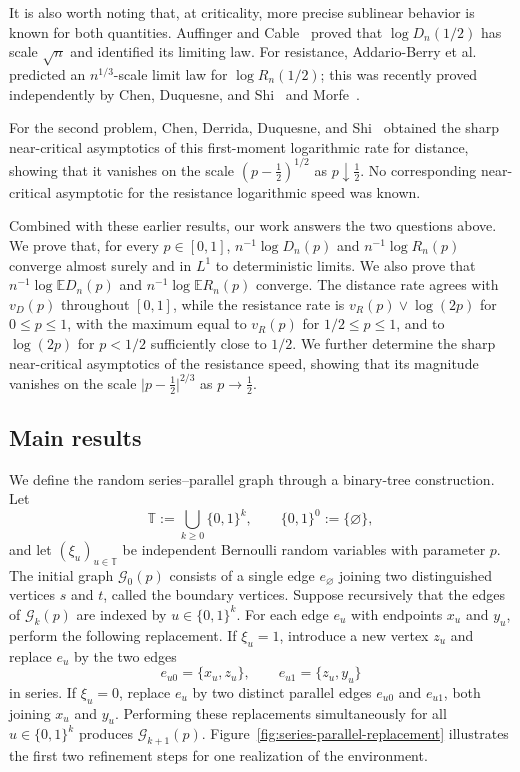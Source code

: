 \documentclass[12pt,preprint]{amsart}
\numberwithin{equation}{section}
\theoremstyle{plain}
\theoremstyle{definition}
\newcommand{\E}{\mathbb E}
\begin{document}
It is also worth noting that, at criticality, more precise sublinear behavior
is known for both quantities.  Auffinger and
Cable~\cite[Theorem~1]{AuffingerCable2017} proved that
$\log D_n(1/2)$ has scale $\sqrt n$ and identified its limiting law.  For
resistance, Addario-Berry et al.~\cite{AddarioBerryEtAl2020} predicted an
$n^{1/3}$-scale limit law for $\log R_n(1/2)$; this was recently proved
independently by Chen, Duquesne, and Shi~\cite{ChenDuquesneShi2026} and
Morfe~\cite{Morfe2026}.

For the second problem, Chen, Derrida, Duquesne, and
Shi~\cite[Theorem~1]{ChenDerridaDuquesneShi2026} obtained the sharp
near-critical asymptotics of this first-moment logarithmic rate for distance,
showing that it vanishes on the scale $(p-\frac12)^{1/2}$ as
$p\downarrow\frac12$.  No corresponding
near-critical asymptotic for the resistance logarithmic speed was known.

Combined with these earlier results, our work answers the two
questions above.  We prove that, for every $p\in[0,1]$,
$n^{-1}\log D_n(p)$ and $n^{-1}\log R_n(p)$ converge almost surely and in
$L^1$ to deterministic limits.  We also prove that
$n^{-1}\log\E D_n(p)$ and $n^{-1}\log\E R_n(p)$ converge.  The distance rate
agrees with $v_D(p)$ throughout $[0,1]$, while the resistance rate is
$v_R(p)\vee\log(2p)$ for $0\le p\le1$, with the maximum equal to $v_R(p)$
for $1/2\le p\le1$, and to $\log(2p)$ for $p<1/2$ sufficiently close to
$1/2$.  We further determine the sharp near-critical asymptotics of the
resistance speed, showing that its magnitude vanishes on the scale
$\lvert p-\frac12\rvert^{2/3}$ as $p\to\frac12$.

\subsection{Main results}
\label{sec:main-results}

We define the random series--parallel graph through a binary-tree
construction.  Let
\[
 \mathbb T:=\bigcup_{k\ge0}\{0,1\}^k,
 \qquad \{0,1\}^0:=\{\varnothing\},
\]
and let $(\xi_u)_{u\in\mathbb T}$ be independent Bernoulli random variables
with parameter $p$.  The initial graph $\mathcal G_0(p)$ consists of a
single edge $e_{\varnothing}$ joining two distinguished vertices $s$ and
$t$, called the boundary vertices.  Suppose recursively that the edges of
$\mathcal G_k(p)$ are indexed by $u\in\{0,1\}^k$.  For each edge $e_u$ with
endpoints $x_u$ and $y_u$, perform the following replacement.  If
$\xi_u=1$, introduce a new vertex $z_u$ and replace $e_u$ by the two edges
\[
 e_{u0}=\{x_u,z_u\},
 \qquad
 e_{u1}=\{z_u,y_u\}
\]
in series.  If $\xi_u=0$, replace $e_u$ by two distinct parallel edges
$e_{u0}$ and $e_{u1}$, both joining $x_u$ and $y_u$.  Performing these
replacements simultaneously for all $u\in\{0,1\}^k$ produces
$\mathcal G_{k+1}(p)$.  Figure~\ref{fig:series-parallel-replacement}
illustrates the first two refinement steps for one realization of the
environment.
\end{document}
